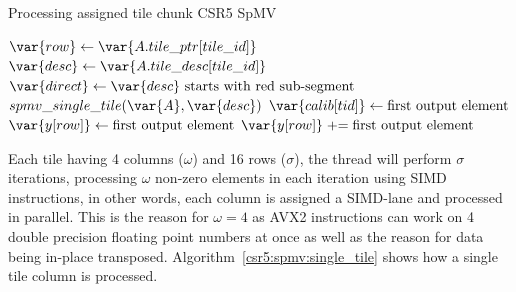 \documentclass[thesis=M,english]{FITthesis}[2019/12/23]
\newcommand{\pluseq}{\mathrel{+}=}
\begin{document}
\begin{algorithm}[h]
    \caption{Processing assigned tile chunk CSR5 SpMV}
    \begin{algorithmic}

        \State $\var{row} \gets \var{A.tile\_ptr[tile\_id]}$
        \State $\var{desc} \gets \var{A.tile\_desc[tile\_id]}$
        \State $\var{direct} \gets \var{desc}\text{ starts with red sub-segment}$
        \State $spmv\_single\_tile(\var{A}, \var{desc})$
        \State $\var{calib[tid]} \gets \text{first output element}$
        \Else
        \State $\var{y[row]} \gets \text{first output element}$
        \Else
        \State $\var{y[row]} \pluseq \text{first output element}$
        \EndIf
        \EndIf
        \EndFor
        \EndFunction
    \end{algorithmic}
\end{algorithm}

Each tile having 4 columns (\(\omega{}\)) and 16 rows (\(\sigma{}\)), the
thread will perform \(\sigma{}\) iterations,
processing \(\omega{}\) non-zero elements in each iteration using SIMD instructions, in other words,
each column is assigned a SIMD-lane and processed in parallel. This is the reason
for \(\omega{} = 4\) as AVX2 instructions can work on 4 double precision floating point numbers at once
as well as the reason for data being in-place transposed. Algorithm~\ref{csr5:spmv:single_tile} shows
how a single tile column is processed.
\end{document}
